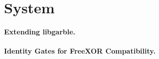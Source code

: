 \section{System}
\label{sec:system}

\paragraph{Extending libgarble.}

\paragraph{Identity Gates for FreeXOR Compatibility.}
